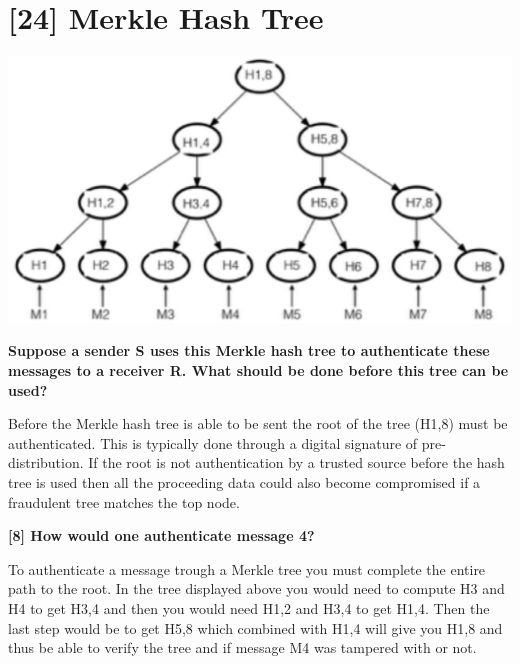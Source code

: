 \documentclass[letterpaper,11pt,notitlepage,fleqn]{article}
\begin{document}
\section{[24] Merkle Hash Tree}
\begin{center}
    \includegraphics[scale=0.5]{tree.eps}
\end{center}

\noindent \textbf{Suppose a sender S uses this Merkle hash tree to authenticate these messages to a receiver R. What should be done before this tree can be used?}

Before the Merkle hash tree is able to be sent the root of the tree (H1,8) must be authenticated. This is typically done through a digital signature of pre-distribution. If the root is not authentication by a trusted source before the hash tree is used then all the proceeding data could also become compromised if a fraudulent tree matches the top node. 

\noindent \textbf{[8] How would one authenticate message 4?}

To authenticate a message trough a Merkle tree you must complete the entire path to the root. In the tree displayed above you would need to compute H3 and H4 to get H3,4 and then you would need H1,2 and H3,4 to get H1,4. Then the last step would be to get H5,8 which combined with H1,4 will give you H1,8 and thus be able to verify the tree and if message M4 was tampered with or not.
\end{document}
